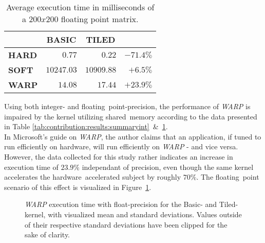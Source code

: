 \documentclass[fleqn,10pt]{SelfArx} %
\begin{document}
\begin{table}[hbt]
\begin{center}
\begin{tabular}{r|r|r|r|}
	\cline{2-3}
							& \multicolumn{1}{|c|}{\textbf{BASIC}} & \multicolumn{1}{|c|}{\textbf{TILED}}	\\ \hline
	\multicolumn{1}{|l|}{\textbf{HARD}}	& $0.77$			& $0.22$		& $-71.4\%$    				\\ \hline
	\multicolumn{1}{|l|}{\textbf{SOFT}}	& $10247.03$		& $10909.88$	& $+6.5\%$     				\\ \hline
	\multicolumn{1}{|l|}{\textbf{WARP}}	& $14.08$			& $17.44$		& $+23.9\%$    				\\ \hline
\end{tabular}
\end{center}
\label{tab:contribution:results:summaryfloat}
\caption{Average execution time in milliseconds of a $200x200$ floating point matrix.}
\end{table}

\noindent
Using both integer- and floating~point-precision, the performance of \textit{WARP} is impaired by the kernel utilizing shared~memory according to the data presented in Table \ref{tab:contribution:results:summaryint}~\&~\ref{tab:contribution:results:summaryfloat}.\\
In Microsoft's guide on \textit{WARP}, the author claims that an application, if tuned to run efficiently on hardware, will run efficiently on \textit{WARP} - and vice versa. However, the data collected for this study rather indicates an increase in execution time of $23.9\%$ independant of precision, even though the same kernel accelerates the hardware~accelerated subject by roughly $70\%$. The floating~point scenario of this effect is visualized in Figure~\ref{fig:contribution:results:warp:msswarp}.

\begin{figure}[htb]
\begin{center}
	\resizebox{ \columnwidth }{!}{}
	\caption{\textit{WARP} execution time with float-precision for the Basic- and Tiled-kernel, with visualized mean and standard deviations. Values outside of their respective standard deviations have been clipped for the sake of clarity.}
	\label{fig:contribution:results:warp:msswarp}
\end{center}
\end{figure}
\end{document}
